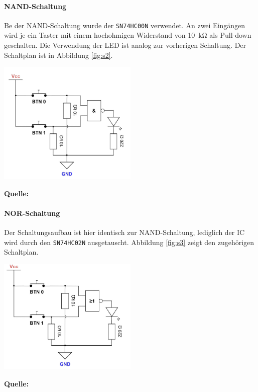 \documentclass[
    paper=a4,
]{scrartcl}
\newcommand{\figsource}[1]{\par\footnotesize\textbf{Quelle:} #1\par}
\begin{document}
    \paragraph{NAND-Schaltung}
        Be der NAND-Schaltung wurde der \texttt{SN74HC00N} verwendet. An zwei Eingängen wird je ein Taster mit einem hochohmigen Widerstand von \SI{10}{\kilo\ohm} als Pull-down geschalten. Die Verwendung der LED ist analog zur vorherigen Schaltung. Der Schaltplan ist in Abbildung \ref{fig:s2}.

        \begin{center}
            \includegraphics[width=0.5\textwidth]{Anhang/Schaltung2.png}
            \figsource{\cite{bauer}}
            \label{fig:s2}
        \end{center}

    \paragraph{NOR-Schaltung}
        Der Schaltungsaufbau ist hier identisch zur NAND-Schaltung, lediglich der IC wird durch den \texttt{SN74HC02N} ausgetauscht. Abbildung \ref{fig:s3} zeigt den zugehörigen Schaltplan.

        \begin{center}
            \includegraphics[width=0.5\textwidth]{Anhang/Schaltung3.png}
            \figsource{\cite{bauer}}
            \label{fig:s3}
        \end{center}
\end{document}
